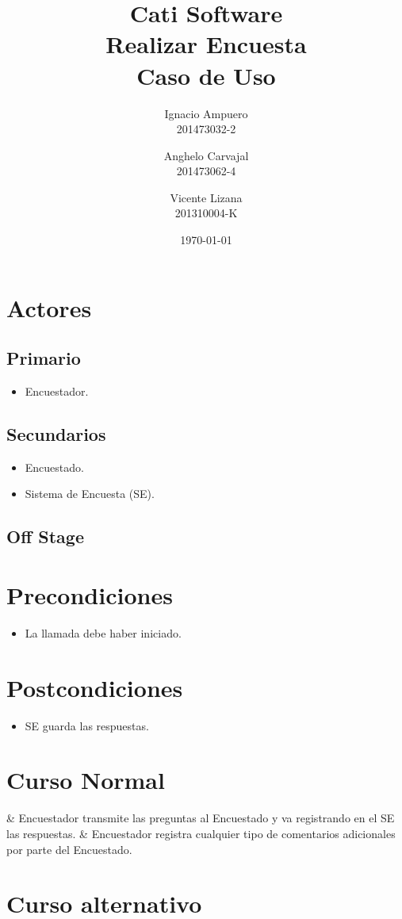 \documentclass[fleqn]{article}
\title{\huge Cati Software\\ \Huge Realizar Encuesta\\ \Large Caso de Uso \vspace{30pt}}
\author{Ignacio Ampuero\\ 201473032-2 \and Anghelo Carvajal\\ 201473062-4 \and Vicente Lizana\\ 201310004-K}
\date{\today}
\begin{document}
\maketitle
\vspace{30pt}

\section{Actores}

	\subsection{Primario}
	
	\begin{itemize}
		\item Encuestador.
	\end{itemize}
	
	\subsection{Secundarios}
	
	\begin{itemize}
		\item Encuestado.
		\item Sistema de Encuesta (SE).
	\end{itemize}
	
	\subsection{Off Stage}

\section{Precondiciones}

\begin{itemize}
	\item La llamada debe haber iniciado.
\end{itemize}

\section{Postcondiciones}

\begin{itemize}
	\item SE guarda las respuestas.
\end{itemize}

\section{Curso Normal}

\begin{easylist}
	& Encuestador transmite las preguntas al Encuestado y va registrando en el SE las respuestas.
	& Encuestador registra cualquier tipo de comentarios adicionales por parte del Encuestado.
\end{easylist}

\section{Curso alternativo}
\end{document}
